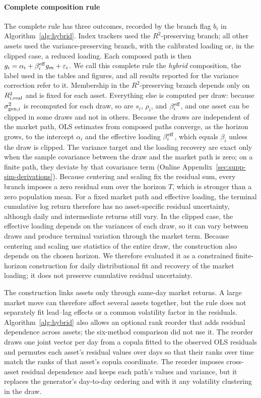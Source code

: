 \paragraph{Complete composition rule}

The complete rule has three outcomes, recorded by the branch flag
$b_i$ in Algorithm~\ref{alg:hybrid}. Index trackers used the
$R^2$-preserving branch; all other assets used the
variance-preserving branch, with the calibrated loading or, in the
clipped case, a reduced loading. Each composed path is then
$g_i=\alpha_i+\beta_i^{\mathrm{eff}}g_m+\varepsilon_i$. We call this complete rule
the \emph{hybrid} composition, the label used in the tables and
figures, and all results reported for the variance correction refer
to it. Membership in the $R^2$-preserving branch depends only on
$R^2_{i,\mathrm{real}}$ and is fixed for each asset. Everything else is
computed per draw: because $\sigma_{\mathrm{gen},i}^2$ is recomputed for each
draw, so are $s_i$, $\rho_i$, and $\beta_i^{\mathrm{eff}}$, and one asset can be
clipped in some draws and not in others. Because the draws are independent of the market path, OLS estimates
from composed paths converge, as the horizon grows, to the intercept
$\alpha_i$ and the effective loading $\beta_i^{\mathrm{eff}}$, which equals
$\beta_i$ unless the draw is clipped. The variance target and the loading recovery are exact only when the
sample covariance between the draw and the market path is zero; on a
finite path, they deviate by that covariance term (Online
Appendix~\ref{sec:supp-sim-derivations}). Because centering and
scaling fix the residual sum, every branch imposes a zero residual sum over the horizon $T$, which is stronger than a zero population
mean. For a fixed market path and effective loading, the terminal
cumulative log return therefore has no asset-specific residual
uncertainty, although daily and intermediate returns still vary. In
the clipped case, the effective loading depends on the variances of
each draw, so it can vary between draws and produce terminal
variation through the market term. Because centering and scaling use
statistics of the entire draw, the construction also depends on the
chosen horizon. We therefore evaluated it as a constrained
finite-horizon construction for daily distributional fit and recovery
of the market loading; it does not preserve cumulative residual uncertainty.

The construction links assets only through same-day market returns.
A large market move can therefore affect several assets together, but
the rule does not separately fit lead--lag effects or a common
volatility factor in the residuals. Algorithm~\ref{alg:hybrid} also
allows an optional rank reorder that adds residual dependence across
assets; the six-method comparison did not use it. The reorder draws
one joint vector per day from a copula fitted to the observed OLS
residuals and permutes each asset's residual values over days so that
their ranks over time match the ranks of that asset's copula
coordinate. The reorder imposes cross-asset residual
dependence and keeps each path's values and variance, but it replaces the generator's day-to-day ordering and with it any
volatility clustering in the draw.


